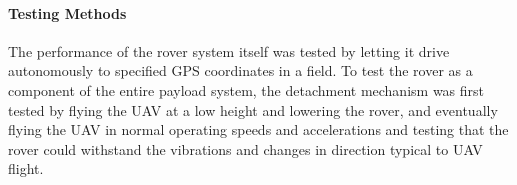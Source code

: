 \paragraph{Testing Methods} 
The performance of the rover system itself was tested by letting it drive autonomously to specified GPS coordinates in a field. To test the rover as a component of the entire payload system, the detachment mechanism was first tested by flying the UAV at a low height and lowering the rover, and eventually flying the UAV in normal operating speeds and accelerations and testing that the rover could withstand the vibrations and changes in direction typical to UAV flight.

\endinput

